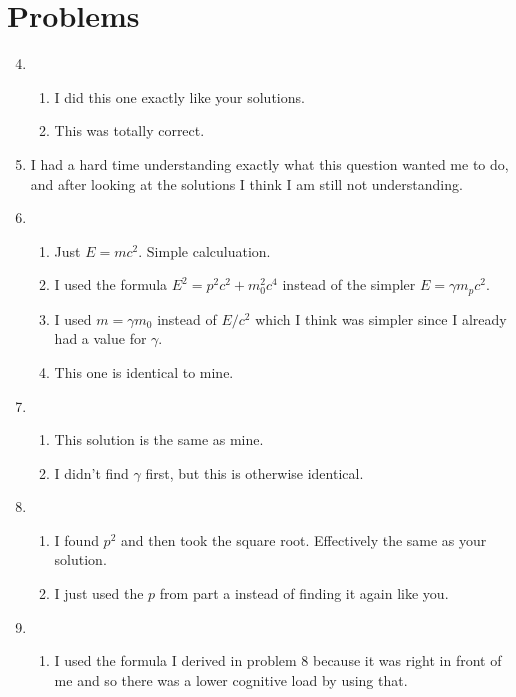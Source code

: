 \documentclass[12pt]{article}
\begin{document}
    \section{Problems}
    \begin{enumerate}
        \setcounter{enumi}{3}
        \item \begin{enumerate}
            \item I did this one exactly like your solutions.
            \item This was totally correct.
        \end{enumerate}
        \item I had a hard time understanding exactly what this question wanted me to do, and after looking at the solutions I think I am still not understanding.
        \item \begin{enumerate}
            \item Just \(E=mc^2\). Simple calculuation.
            \item I used the formula \(E^2 = p^2c^2 + m_0^2c^4\) instead of the simpler \(E=\gamma m_pc^2\).
            \item I used \(m = \gamma m_0\) instead of \(E/c^2\) which I think was simpler since I already had a value for \(\gamma\).
            \item This one is identical to mine.
        \end{enumerate}
        \item \begin{enumerate}
            \item This solution is the same as mine.
            \item I didn't find \(\gamma\) first, but this is otherwise identical.
        \end{enumerate}
        \item \begin{enumerate}
            \item I found \(p^2\) and then took the square root. Effectively the same as your solution.
            \item I just used the \(p\) from part a instead of finding it again like you.
        \end{enumerate}
        \item \begin{enumerate}
            \item I used the formula I derived in problem 8 because it was right in front of me and so there was a lower cognitive load by using that.

\end{enumerate}
\end{enumerate}
\end{document}
